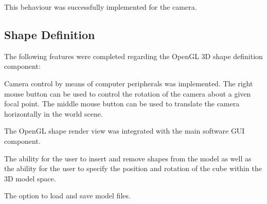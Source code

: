 This behaviour was successfully implemented for the camera.

\subsection{Shape Definition}

The following features were completed regarding the OpenGL 3D shape definition component:

\begin{compactitem}
	\item Camera control by means of computer peripherals was implemented. The right mouse button can be used to control the rotation of the camera about a given focal point. The middle mouse button can be used to translate the camera horizontally in the world scene.
	\item The OpenGL shape render view was integrated with the main software \ac{GUI} component.
	\item The ability for the user to insert and remove shapes from the model as well as the ability for the user to specify the position and rotation of the cube within the 3D model space.
	\item The option to load and save model files.
\end{compactitem}

\pendsign
